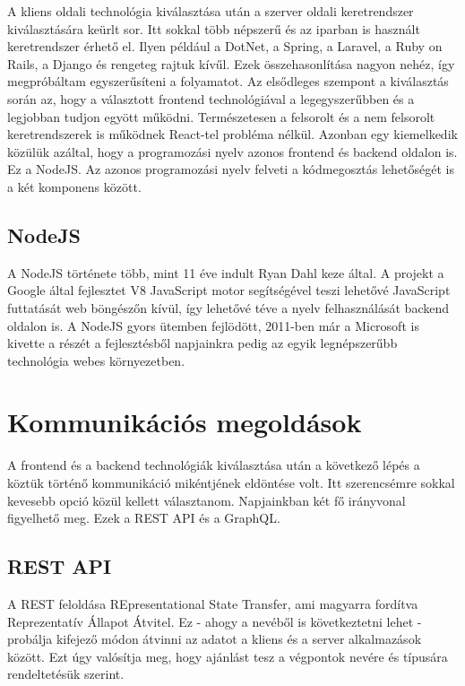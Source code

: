 A kliens oldali technológia kiválasztása után a szerver oldali keretrendszer kiválasztására keürlt sor.
Itt sokkal több népszerű és az iparban is használt keretrendszer érhető el. Ilyen például a DotNet, a Spring, a Laravel, a Ruby on Rails, a Django és rengeteg rajtuk kívűl. Ezek összehasonlítása nagyon nehéz, így megpróbáltam egyszerűsíteni a folyamatot. Az elsődleges szempont a kiválasztás során az, hogy a választott frontend technológiával a legegyszerűbben és a legjobban tudjon egyött működni. Természetesen a felsorolt és a nem felsorolt keretrendszerek is működnek React-tel probléma nélkül. Azonban egy kiemelkedik közülük azáltal, hogy a programozási nyelv azonos frontend és backend oldalon is. Ez a NodeJS. Az azonos programozási nyelv felveti a kódmegosztás lehetőségét is a két komponens között. 

\subsection{NodeJS}
A NodeJS története több, mint 11 éve indult Ryan Dahl keze által. A projekt a Google által fejlesztet V8 JavaScript motor segítségével teszi lehetővé JavaScript futtatását web böngészőn kívül, így lehetővé téve a nyelv felhasználását backend oldalon is. A NodeJS gyors ütemben fejlödött, 2011-ben már a Microsoft is kivette a részét a fejlesztésből napjainkra pedig az egyik legnépszerűbb technológia webes környezetben.

\section{Kommunikációs megoldások}
A frontend és a backend technológiák kiválasztása után a következő lépés a köztük történő kommunikáció mikéntjének eldöntése volt.
Itt szerencsémre sokkal kevesebb opció közül kellett választanom. Napjainkban két fő irányvonal figyelhető meg. Ezek a REST API és a GraphQL.

\subsection{REST API}
A REST feloldása REpresentational State Transfer, ami magyarra fordítva Reprezentatív Állapot Átvitel. Ez - ahogy a nevéből is következtetni lehet - probálja kifejező módon átvinni az adatot a kliens és a server alkalmazások között.
Ezt úgy valósítja meg, hogy ajánlást tesz a végpontok nevére és típusára rendeltetésük szerint.

